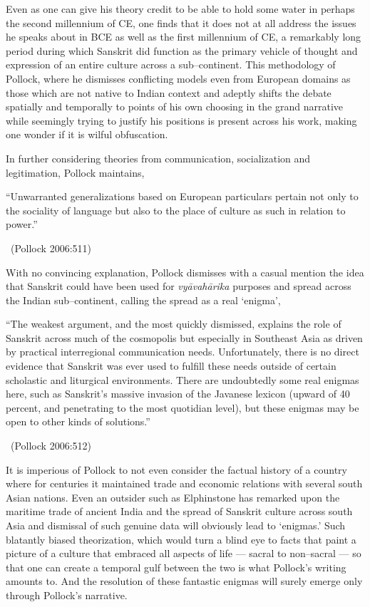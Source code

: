 Even as one can give his theory credit to be able to hold some water in perhaps the second millennium of CE, one finds that it does not at all address the issues he speaks about in BCE as well as the first millennium of CE, a remarkably long period during which Sanskrit did function as the primary vehicle of thought and expression of an entire culture across a sub–continent. This methodology of Pollock, where he dismisses conflicting models even from European domains as those which are not native to Indian context and adeptly shifts the debate spatially and temporally to points of his own choosing in the grand narrative while seemingly trying to justify his positions is present across his work, making one wonder if it is wilful obfuscation.

In further considering theories from communication, socialization and legitimation, Pollock maintains,

\begin{myquote}
“Unwarranted generalizations based on European particulars pertain not only to the sociality of language but also to the place of culture as such in relation to power.” 

~\hfill (Pollock 2006:511)
\end{myquote}

With no convincing explanation, Pollock dismisses with a casual mention the idea that Sanskrit could have been used for \textit{vyāvahārika} purposes and spread across the Indian sub–continent, calling the spread as a real ‘enigma’,

\begin{myquote}
“The weakest argument, and the most quickly dismissed, explains the role of Sanskrit across much of the cosmopolis but especially in Southeast Asia as driven by practical interregional communication needs. Unfortunately, there is no direct evidence that Sanskrit was ever used to fulfill these needs outside of certain scholastic and liturgical environments. There are undoubtedly some real enigmas here, such as Sanskrit’s massive invasion of the Javanese lexicon (upward of 40 percent, and penetrating to the most quotidian level), but these enigmas may be open to other kinds of solutions.” 

~\hfill (Pollock 2006:512)
\end{myquote}

It is imperious of Pollock to not even consider the factual history of a country where for centuries it maintained trade and economic relations with several south Asian nations. Even an outsider such as Elphinstone has remarked upon the maritime trade of ancient India and the spread of Sanskrit culture across south Asia and dismissal of such genuine data will obviously lead to ‘enigmas.’ Such blatantly biased theorization, which would turn a blind eye to facts that paint a picture of a culture that embraced all aspects of life — sacral to non–sacral — so that one can create a temporal gulf between the two is what Pollock’s writing amounts to. And the resolution of these fantastic enigmas will surely emerge only through Pollock’s narrative.

